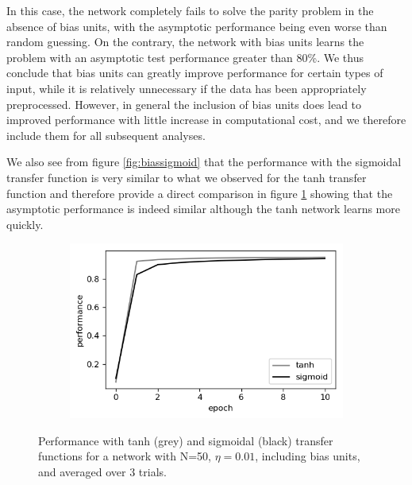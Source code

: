\documentclass{article}
\begin{document}

In this case, the network completely fails to solve the parity problem in the absence of bias units, with the asymptotic performance being even worse than random guessing. On the contrary, the network with bias units learns the problem with an asymptotic test performance greater than 80\%. We thus conclude that bias units can greatly improve performance for certain types of input, while it is relatively unnecessary if the data has been appropriately preprocessed. However, in general the inclusion of bias units does lead to improved performance with little increase in computational cost, and we therefore include them for all subsequent analyses.

 We also see from figure \ref{fig:biassigmoid} that the performance with the sigmoidal transfer function is very similar to what we observed for the tanh transfer function and therefore provide a direct comparison in figure \ref{fig:transfers} showing that the asymptotic performance is indeed similar although the tanh network learns more quickly.

\begin{figure}[h]
	\centering
	\begin{subfigure}[t]{0.52\linewidth}
		\centering
		\includegraphics[width = 1.0\linewidth, trim={5 5 5 5}, clip=true]{figures/tanh_sigmoidal_transfers.png}
	\end{subfigure}%
\caption{Performance with tanh (grey) and sigmoidal (black) transfer functions for a network with N=50, $\eta = 0.01$, including bias units, and averaged over 3 trials.}
\label{fig:transfers}
\end{figure}

\newpage
\end{document}
